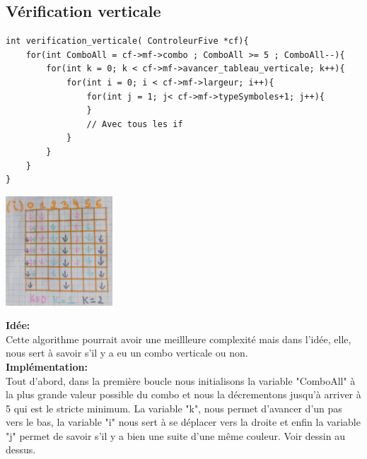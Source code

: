 \documentclass[a4paper, 11pt, oneside]{article}
\begin{document}
\subsection{Vérification verticale}
\begin{lstlisting}
int verification_verticale( ControleurFive *cf){
    for(int ComboAll = cf->mf->combo ; ComboAll >= 5 ; ComboAll--){
        for(int k = 0; k < cf->mf->avancer_tableau_verticale; k++){
            for(int i = 0; i < cf->mf->largeur; i++){
                for(int j = 1; j< cf->mf->typeSymboles+1; j++){
                }
                // Avec tous les if
            }
        }
    }
}
\end{lstlisting}
\begin{center}
    \includegraphics[width=4cm]{./images/verticale.jpg}\\ 
\end{center} 


\textbf{Idée:}\\
Cette algorithme pourrait avoir une meillleure complexité mais dans l'idée, elle, nous sert à savoir s'il y a eu un combo verticale ou non.
\\
\textbf{Implémentation:}\\
Tout d'abord, dans la première boucle nous initialisons la variable "ComboAll" à la plus grande valeur possible du combo et nous la décrementons jusqu'à arriver à 5 qui est le stricte minimum.
La variable "k", nous permet d'avancer d'un pas vers le bas, la variable "i" nous sert à se déplacer vers la droite et enfin la variable "j" permet de savoir s'il y a bien une suite d'une même couleur.
Voir dessin au dessus.
\end{document}
